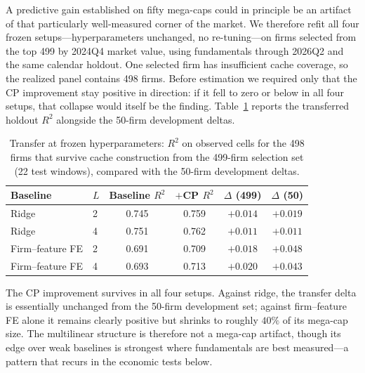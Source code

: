 \documentclass[pdflatex,sn-mathphys-num]{sn-jnl}%
\theoremstyle{thmstyleone}%
\theoremstyle{thmstyletwo}%
\theoremstyle{thmstylethree}%
\begin{document}
A predictive gain established on fifty mega-caps could in principle be an artifact of that particularly well-measured corner of the market. We therefore refit all four frozen setups---hyperparameters unchanged, no re-tuning---on firms selected from the top 499 by 2024Q4 market value, using fundamentals through 2026Q2 and the same calendar holdout. One selected firm has insufficient cache coverage, so the realized panel contains 498 firms. Before estimation we required only that the CP improvement stay positive in direction: if it fell to zero or below in all four setups, that collapse would itself be the finding. Table~\ref{Tab:Transfer_499} reports the transferred holdout $R^2$ alongside the 50-firm development deltas.

\begin{table}[!htbp]
\centering
\caption{Transfer at frozen hyperparameters: $R^2$ on observed cells for the 498 firms that survive cache construction from the 499-firm selection set (22 test windows), compared with the 50-firm development deltas.}
\label{Tab:Transfer_499}
\begin{tabular}{llcccc}
\toprule
Baseline & $L$ & Baseline $R^2$ & $+$CP $R^2$ & $\Delta$ (499) & $\Delta$ (50) \\
\midrule
Ridge              & 2 & 0.745 & 0.759 & $+0.014$ & $+0.019$ \\
Ridge              & 4 & 0.751 & 0.762 & $+0.011$ & $+0.011$ \\
Firm--feature FE & 2 & 0.691 & 0.709 & $+0.018$ & $+0.048$ \\
Firm--feature FE & 4 & 0.693 & 0.713 & $+0.020$ & $+0.043$ \\
\bottomrule
\end{tabular}
\end{table}

The CP improvement survives in all four setups. Against ridge, the transfer delta is essentially unchanged from the 50-firm development set; against firm--feature FE alone it remains clearly positive but shrinks to roughly $40\%$ of its mega-cap size. The multilinear structure is therefore not a mega-cap artifact, though its edge over weak baselines is strongest where fundamentals are best measured---a pattern that recurs in the economic tests below.



\end{document}
